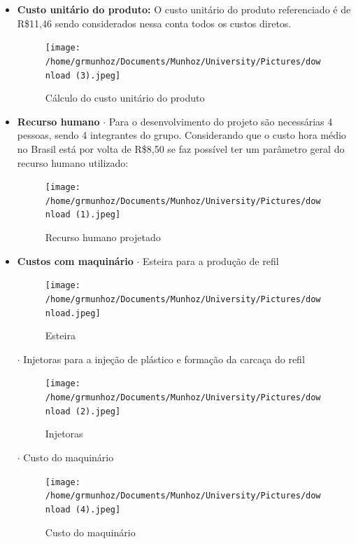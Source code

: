\documentclass[
	12pt,				%
	openright,			%
	oneside,			%
	a4paper,			%
	english,			%
	french,				%
	spanish,			%
	brazil				%
	]{abntex2}
\begin{document}
\begin{itemize}
\item \textbf{Custo unitário do produto:} O custo unitário do produto referenciado é de R\$11,46 sendo considerados nessa conta todos os custos diretos.

\begin{figure}[H]
\begin{center}
\caption{Cálculo do custo unitário do produto}
\texttt{[image: /home/grmunhoz/Documents/Munhoz/University/Pictures/download (3).jpeg]} 
\end{center}
\end{figure}

\item \textbf{Recurso humano}
	\subitem $\cdot$ Para o desenvolvimento do projeto são necessárias 4 pessoas, sendo 4 integrantes do grupo. Considerando que o custo hora médio no Brasil está por volta de R\$8,50 se faz possível ter um parâmetro geral do recurso humano utilizado:
	
\begin{figure}[H]
\begin{center}
\caption{Recurso humano projetado}
\texttt{[image: /home/grmunhoz/Documents/Munhoz/University/Pictures/download (1).jpeg]} 
\end{center}
\end{figure}	
	
\item \textbf{Custos com maquinário}
	\subitem $\cdot$ Esteira para a produção de refil
	
\begin{figure}[H]
\begin{center}
\caption{Esteira}
\texttt{[image: /home/grmunhoz/Documents/Munhoz/University/Pictures/download.jpeg]} 
\end{center}
\end{figure}		
	
	\subitem $\cdot$ Injetoras para a injeção de plástico e formação da carcaça do refil
	
\begin{figure}[H]
\begin{center}
\caption{Injetoras}
\texttt{[image: /home/grmunhoz/Documents/Munhoz/University/Pictures/download (2).jpeg]} 
\end{center}
\end{figure}		
	
	\subitem $\cdot$ Custo do maquinário

\begin{figure}[H]
\begin{center}
\caption{Custo do maquinário}
\texttt{[image: /home/grmunhoz/Documents/Munhoz/University/Pictures/download (4).jpeg]} 
\end{center}
\end{figure}	

\end{itemize}
\end{document}
